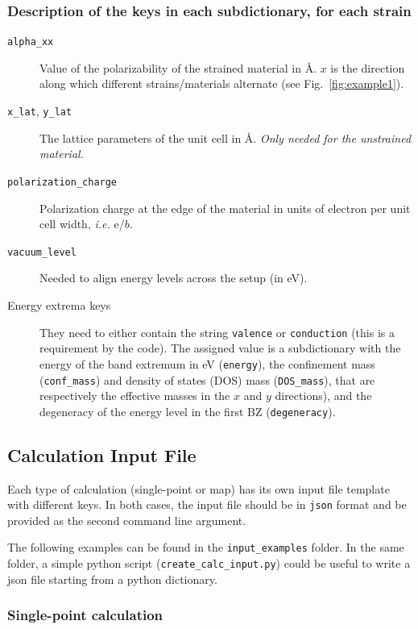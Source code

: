 \documentclass[a4paper,12pt]{article}
\newcommand{\angstrom}{\textup{\AA}}
\begin{document}
\subsubsection*{Description of the keys in each subdictionary, for each strain}
\begin{description}
\item[\texttt{alpha\_xx}] Value of the polarizability of the strained material in \angstrom. $x$ is the direction along which different strains/materials alternate (see Fig.~\ref{fig:example1}).

\item[\texttt{x\_lat}, \texttt{y\_lat}] The lattice parameters of the unit cell in \angstrom. \emph{Only needed for the unstrained material.}

\item[\texttt{polarization\_charge}] Polarization charge at the edge of the material in units of electron per unit cell width, \textit{i.e.} e/$b$.

\item[\texttt{vacuum\_level}] Needed to align energy levels across the setup (in eV).

\item[Energy extrema keys] They need to either contain the string \texttt{valence} or \texttt{conduction} (this is a requirement by the code). The assigned value is a subdictionary with the energy of the band extremum in eV (\texttt{energy}), the confinement mass (\texttt{conf\_mass}) and density of states (DOS) mass (\texttt{DOS\_mass}), that are respectively the effective masses in the $x$ and $y$ directions), and the degeneracy of the energy level in the first BZ (\texttt{degeneracy}).
\end{description}


\subsection{Calculation Input File}
Each type of calculation (single-point or map) has its own input file template with different keys. In both cases, the input file should be in \texttt{json} format and be provided as the second command line argument. 

The following examples can be found in the \texttt{input\_examples} folder. In the same folder, a simple python script (\texttt{create\_calc\_input.py}) could be useful to write a json file starting from a python dictionary.

\subsubsection{Single-point calculation}
\end{document}
